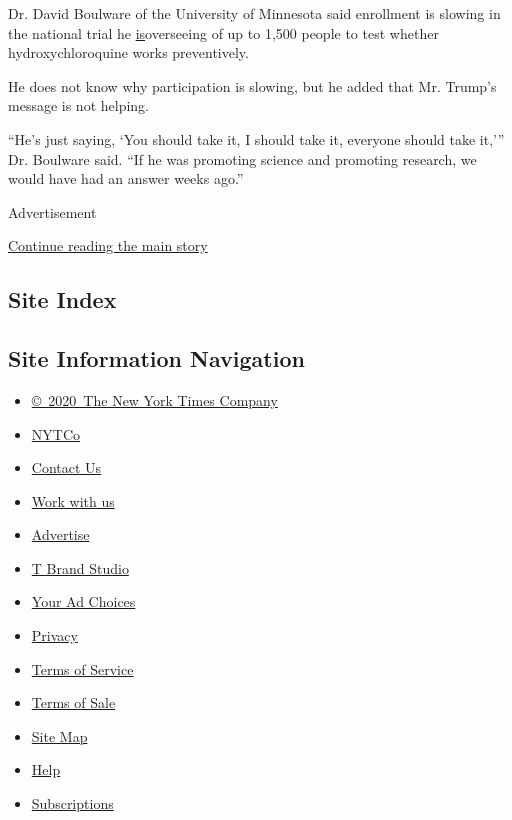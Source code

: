 Dr. David Boulware of the University of Minnesota said enrollment is
slowing in the national trial he
\href{https://med.umn.edu/news-events/covid-19-clinical-trial-launches-university-minnesota}{is}overseeing
of up to 1,500 people to test whether hydroxychloroquine works
preventively.

He does not know why participation is slowing, but he added that Mr.
Trump's message is not helping.

``He's just saying, `You should take it, I should take it, everyone
should take it,''' Dr. Boulware said. ``If he was promoting science and
promoting research, we would have had an answer weeks ago.''

Advertisement

\protect\hyperlink{after-bottom}{Continue reading the main story}

\hypertarget{site-index}{%
\subsection{Site Index}\label{site-index}}

\hypertarget{site-information-navigation}{%
\subsection{Site Information
Navigation}\label{site-information-navigation}}

\begin{itemize}
\tightlist
\item
  \href{https://help.nytimes3xbfgragh.onion/hc/en-us/articles/115014792127-Copyright-notice}{©~2020~The
  New York Times Company}
\end{itemize}

\begin{itemize}
\tightlist
\item
  \href{https://www.nytco.com/}{NYTCo}
\item
  \href{https://help.nytimes3xbfgragh.onion/hc/en-us/articles/115015385887-Contact-Us}{Contact
  Us}
\item
  \href{https://www.nytco.com/careers/}{Work with us}
\item
  \href{https://nytmediakit.com/}{Advertise}
\item
  \href{http://www.tbrandstudio.com/}{T Brand Studio}
\item
  \href{https://www.nytimes3xbfgragh.onion/privacy/cookie-policy\#how-do-i-manage-trackers}{Your
  Ad Choices}
\item
  \href{https://www.nytimes3xbfgragh.onion/privacy}{Privacy}
\item
  \href{https://help.nytimes3xbfgragh.onion/hc/en-us/articles/115014893428-Terms-of-service}{Terms
  of Service}
\item
  \href{https://help.nytimes3xbfgragh.onion/hc/en-us/articles/115014893968-Terms-of-sale}{Terms
  of Sale}
\item
  \href{https://spiderbites.nytimes3xbfgragh.onion}{Site Map}
\item
  \href{https://help.nytimes3xbfgragh.onion/hc/en-us}{Help}
\item
  \href{https://www.nytimes3xbfgragh.onion/subscription?campaignId=37WXW}{Subscriptions}
\end{itemize}
